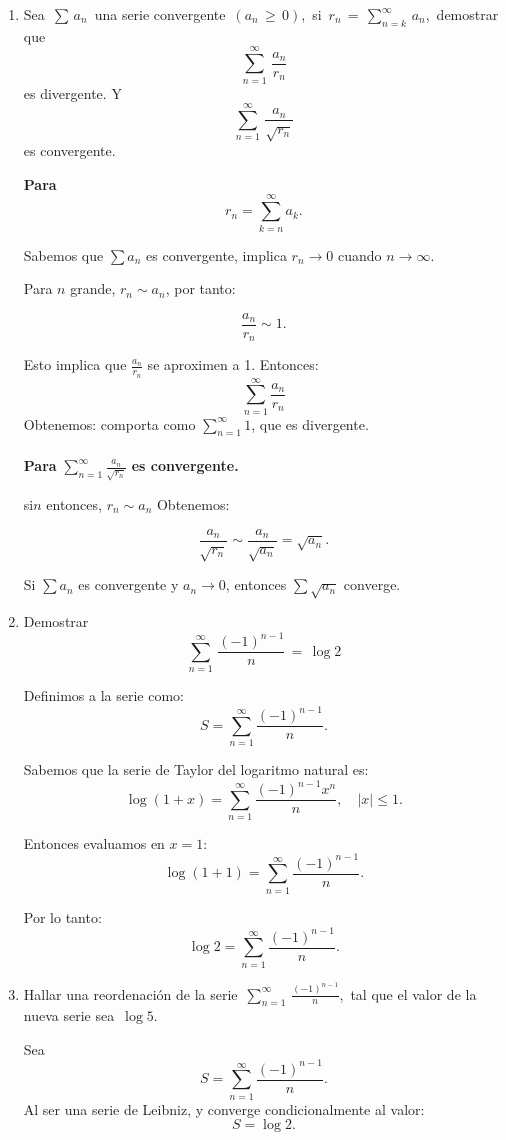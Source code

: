 \documentclass{article}
\begin{document}
\begin{enumerate}
\item Sea \,$\sum\, a_n$\, una serie convergente \,$(a_n\,\geq\,0)$,\, si \,$r_n\,=\,\sum_{n=k}^{\infty}\, a_n$,\, demostrar que
\[
\sum_{n=1}^{\infty}\, \frac{a_n}{r_n}
\]
es divergente. Y
\[
\sum_{n=1}^{\infty}\, \frac{a_n}{\sqrt{r_n}}
\]
es convergente.



\textbf{Para}
\[
r_n = \sum_{k=n}^{\infty} a_k.
\]

Sabemos que \(\sum a_n\) es convergente, implica \(r_n \to 0\) cuando \(n \to \infty\).

Para \(n\) grande, \(r_n \sim a_n\), por tanto:

\[
\frac{a_n}{r_n} \sim 1.
\]

Esto implica que \(\frac{a_n}{r_n}\) se aproximen a 1. 
Entonces:
\[
\sum_{n=1}^{\infty} \frac{a_n}{r_n}
\]
Obtenemos:
comporta como \(\sum_{n=1}^{\infty} 1\), que es divergente.
\\
\\
\textbf{Para}  \(\sum_{n=1}^{\infty} \frac{a_n}{\sqrt{r_n}}\) \textbf{ es convergente.}

si\(n\) entonces, \(r_n \sim a_n\)
Obtenemos:

\[
\frac{a_n}{\sqrt{r_n}} \sim \frac{a_n}{\sqrt{a_n}} = \sqrt{a_n}.
\]

Si \(\sum a_n\) es convergente y \(a_n \to 0\), entonces \(\sum \sqrt{a_n}\) converge.





\item Demostrar
\[
\sum_{n=1}^{\infty}\,\frac{(-1)^{n-1}}{n}\,=\,\log2
\]

Definimos a la serie como:  
\[
S = \sum_{n=1}^\infty \frac{(-1)^{n-1}}{n}.
\]

Sabemos que la serie de Taylor del logaritmo natural es:  
\[
\log(1+x) = \sum_{n=1}^\infty \frac{(-1)^{n-1}x^n}{n}, \quad |x| \leq 1.
\]

Entonces evaluamos en \(x = 1\):  
\[
\log(1+1) = \sum_{n=1}^\infty \frac{(-1)^{n-1}}{n}.
\]

Por lo tanto:  
\[
\log 2 = \sum_{n=1}^\infty \frac{(-1)^{n-1}}{n}.
\]






\item Hallar una reordenaci\'on de la serie \,$\displaystyle\sum_{n=1}^{\infty}\,\frac{(-1)^{n-1}}{n}$,\, tal que el valor de la nueva serie sea \,$\log5$.

Sea  
\[
S = \sum_{n=1}^\infty \frac{(-1)^{n-1}}{n}.
\]  
Al ser una serie de Leibniz, y converge condicionalmente al valor:  
\[
S = \log 2.
\]  


\end{enumerate}
\end{document}
